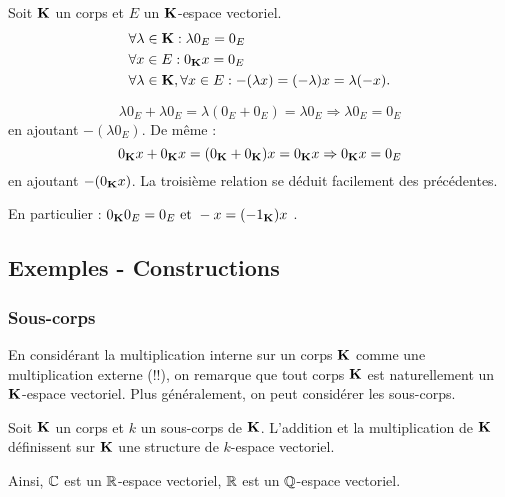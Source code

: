 \begin{prop}
Soit $\mathbf{K}$ un corps et $E$ un $\mathbf{K}$-espace vectoriel. 
\begin{align*}
  &\forall \lambda \in \mathbf{K} :  \lambda 0_E = 0_E\\
  &\forall x \in E : 0_{\mathbf{K}} x = 0_E\\
  &\forall \lambda\in \mathbf{K}, \forall x\in E : -(\lambda x) = (-\lambda)x = \lambda (-x).
\end{align*}
\end{prop}
\begin{demo}
 \begin{displaymath}
\lambda 0_E + \lambda 0_E =\lambda(0_E+0_E)=\lambda 0_E \Rightarrow \lambda 0_E = 0_E  
 \end{displaymath}
en ajoutant $-(\lambda 0_E)$. De même :
\begin{displaymath}
 0_{\mathbf{K}} x + 0_{\mathbf{K}} x = (0_{\mathbf{K}} + 0_{\mathbf{K}})x = 0_{\mathbf{K}} x \Rightarrow  0_{\mathbf{K}} x = 0_E
\end{displaymath}
 en ajoutant $-( 0_{\mathbf{K}} x) $. La troisième relation se déduit facilement des précédentes.
\end{demo}

\begin{rem}
 En particulier : $0_{\mathbf{K}} 0_E =0_E\text{ et } -x=(-1_{\mathbf{K}})x$ .
\end{rem}

\subsection{Exemples - Constructions}
\subsubsection{Sous-corps}
En considérant la multiplication interne sur un corps $\mathbf{K}$ comme une multiplication externe (!!), on remarque que tout corps $\mathbf{K}$ est naturellement un $\mathbf{K}$-espace vectoriel. Plus généralement, on peut considérer les sous-corps.
\begin{prop}
 Soit $\mathbf{K}$ un corps et $k$ un sous-corps de $\mathbf{K}$. L'addition et la multiplication de $\mathbf{K}$ définissent sur $\mathbf{K}$ une structure de $k$-espace vectoriel.
\end{prop}
\begin{exple}
 Ainsi, $\mathbb{C}$ est un $\mathbb{R}$-espace vectoriel, $\mathbb{R}$ est un $\mathbb{Q}$-espace vectoriel.
\end{exple}

